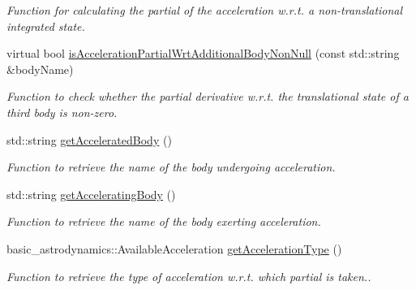 \begin{DoxyCompactItemize}
\begin{DoxyCompactList}\small\item\em Function for calculating the partial of the acceleration w.\+r.\+t. a non-\/translational integrated state. \end{DoxyCompactList}\item 
virtual bool \hyperlink{classtudat_1_1acceleration__partials_1_1AccelerationPartial_ae6278c8e04765a3f0485c57ea9d8c6f3}{is\+Acceleration\+Partial\+Wrt\+Additional\+Body\+Non\+Null} (const std\+::string \&body\+Name)
\begin{DoxyCompactList}\small\item\em Function to check whether the partial derivative w.\+r.\+t. the translational state of a third body is non-\/zero. \end{DoxyCompactList}\item 
std\+::string \hyperlink{classtudat_1_1acceleration__partials_1_1AccelerationPartial_a0bf7d418855165be4d40b82cfbeb115c}{get\+Accelerated\+Body} ()
\begin{DoxyCompactList}\small\item\em Function to retrieve the name of the body undergoing acceleration. \end{DoxyCompactList}\item 
std\+::string \hyperlink{classtudat_1_1acceleration__partials_1_1AccelerationPartial_ac74a861f66f3362524aec1f0266513cf}{get\+Accelerating\+Body} ()
\begin{DoxyCompactList}\small\item\em Function to retrieve the name of the body exerting acceleration. \end{DoxyCompactList}\item 
basic\+\_\+astrodynamics\+::\+Available\+Acceleration \hyperlink{classtudat_1_1acceleration__partials_1_1AccelerationPartial_a6b6e323de35eaeb1292e4bfb410da7b1}{get\+Acceleration\+Type} ()
\begin{DoxyCompactList}\small\item\em Function to retrieve the type of acceleration w.\+r.\+t. which partial is taken.. \end{DoxyCompactList}\end{DoxyCompactItemize}
